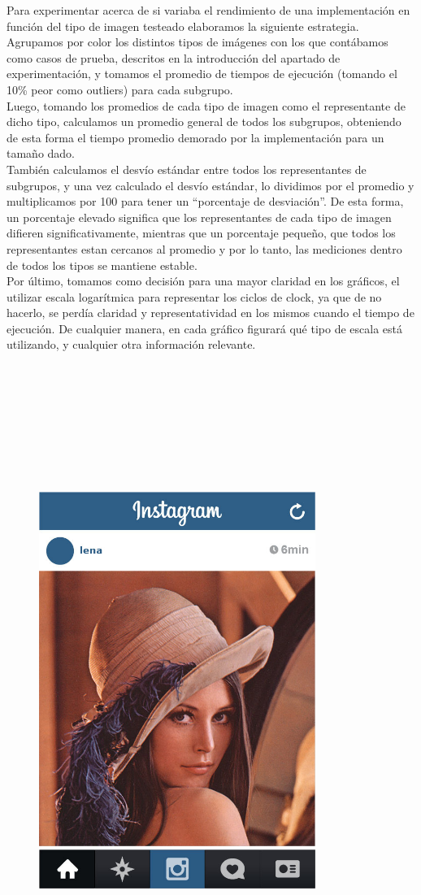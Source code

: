 Para experimentar acerca de si variaba el rendimiento de una implementación en función del tipo de imagen testeado elaboramos la siguiente estrategia. Agrupamos por color los distintos tipos de imágenes con los que contábamos como casos de prueba, descritos en la introducción del apartado de experimentación, y tomamos el promedio de tiempos de ejecución (tomando el 10\% peor como outliers) para cada subgrupo.\\ 
Luego, tomando los promedios de cada tipo de imagen como el representante de dicho tipo, calculamos un promedio general de todos los subgrupos, obteniendo de esta forma el tiempo promedio demorado por la implementación para un tamaño dado.\\
También calculamos el desvío estándar entre todos los representantes de subgrupos, y una vez calculado el desvío estándar, lo dividimos por el promedio y multiplicamos por 100 para tener un “porcentaje de desviación”. De esta forma, un porcentaje elevado significa que los representantes de cada tipo de imagen difieren significativamente, mientras que un porcentaje pequeño, que todos los representantes estan cercanos al promedio y por lo tanto, las mediciones dentro de todos los tipos se mantiene estable.\\

Por último, tomamos como decisión para una mayor claridad en los gráficos, el utilizar escala logarítmica para representar los ciclos de clock, ya que de no hacerlo, se perdía claridad y representatividad en los mismos cuando el tiempo de ejecución. De cualquier manera, en cada gráfico figurará qué tipo de escala está utilizando, y cualquier otra información relevante.\\\\\\\\\\\\\\\\\\

\begin{figure}[ht]
\centering
\includegraphics[width=90mm]{introduccion/lena_instagram.jpg}
\end{figure}

